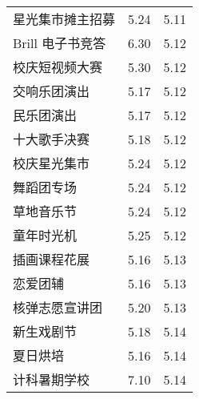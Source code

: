 \documentclass[letterpaper, 12pt]{article}
\begin{document}
\begin{multicols}{2}
{\begin{longtable}{|>{\centering\arraybackslash}m{}|m{}|m{}|}
    星光集市摊主招募 & 5.24 & 5.11\\
    Brill 电子书竞答 & 6.30 & 5.12\\
    校庆短视频大赛 & 5.30 & 5.12\\
    交响乐团演出 & 5.17 & 5.12\\
    民乐团演出 & 5.17 & 5.12\\
    十大歌手决赛 & 5.18 & 5.12\\
    校庆星光集市 & 5.24 & 5.12\\
    舞蹈团专场 & 5.24 & 5.12\\
    草地音乐节 & 5.24 & 5.12\\
    童年时光机 & 5.25 & 5.12\\
    插画课程花展 & 5.16 & 5.13\\
    恋爱团辅 & 5.16 & 5.13\\
    核弹志愿宣讲团 & 5.20 & 5.13\\
    新生戏剧节 & 5.18 & 5.14\\
    夏日烘培 & 5.16 & 5.14\\
    计科暑期学校 & 7.10 & 5.14\\
    \hline
\end{longtable}
\unskip
\unpenalty
\unpenalty}\unvbox\colbbox
\end{multicols}
\end{document}
